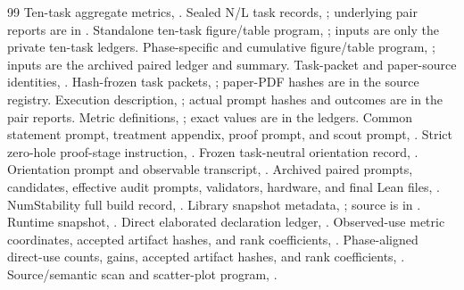 \documentclass[10pt,a4paper]{article}
\begin{document}
\begin{thebibliography}{99}\footnotesize\RaggedRight\setlength{\itemsep}{0pt}\setlength{\parskip}{0pt}
 Ten-task aggregate metrics, .
 Sealed N/L task records, ; underlying pair reports are in .
 Standalone ten-task figure/table program, ; inputs are only the private ten-task ledgers.
 Phase-specific and cumulative figure/table program, ; inputs are the archived paired ledger and summary.
 Task-packet and paper-source identities, .
 Hash-frozen task packets, ; paper-PDF hashes are in the source registry.
 Execution description, ; actual prompt hashes and outcomes are in the pair reports.
 Metric definitions, ; exact values are in the ledgers.
 Common statement prompt, treatment appendix, proof prompt, and scout prompt, .
 Strict zero-hole proof-stage instruction, .
 Frozen task-neutral orientation record, .
 Orientation prompt and observable transcript, .
 Archived paired prompts, candidates, effective audit prompts, validators, hardware, and final Lean files, .
 NumStability full build record, .
 Library snapshot metadata, ; source is in .
 Runtime snapshot, .
 Direct elaborated declaration ledger, .
 Observed-use metric coordinates, accepted artifact hashes, and rank coefficients, .
 Phase-aligned direct-use counts, gains, accepted artifact hashes, and rank coefficients, .
 Source/semantic scan and scatter-plot program, .

\end{thebibliography}
\end{document}
